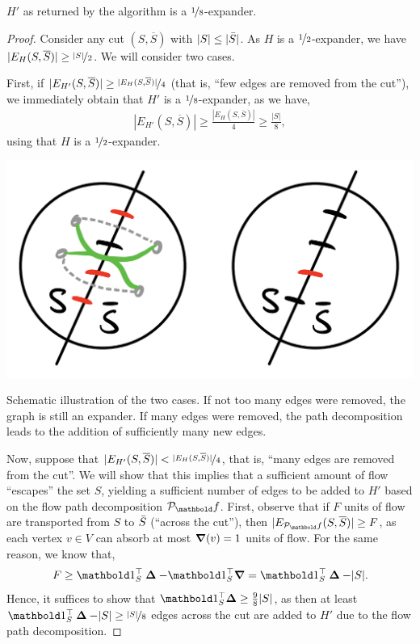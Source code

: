 \documentclass[nobib]{tufte-handout}
\newcommand{\cut}{(S, \overline{S})}
\newcommand{\pathdecomp}{\mathcal{P}_\vf}
\begin{document}
\begin{thm}
$H'$ as returned by the algorithm is a $\nicefrac{1}{8}$-expander.
\end{thm}
\begin{proof}
Consider any cut $\cut$ with $|S| \leq |\Bar{S}|$. As $H$ is a $\nicefrac{1}{2}$-expander, we have $|E_H\cut| \geq \nicefrac{|S|}{2}$. We will consider two cases.

First, if $|E_{H'}\cut| \geq \nicefrac{|E_H\cut|}{4}$ (that is, ``few edges are removed from the cut''), we immediately obtain that $H'$ is a $\nicefrac{1}{8}$-expander, as we have, \begin{align*}
    |E_{H'}\cut| \geq \frac{|E_H\cut|}{4} \geq \frac{|S|}{8},
\end{align*} using that $H$ is a $\nicefrac{1}{2}$-expander.

\begin{marginfigure}[7\baselineskip]
\includegraphics[width=\textwidth]{assignments/figures/cuts.png}
\caption{Schematic illustration of the two cases. If not too many edges were removed, the graph is still an expander. If many edges were removed, the path decomposition leads to the addition of sufficiently many new edges.}
\end{marginfigure}

Now, suppose that $|E_{H'}\cut| < \nicefrac{|E_H\cut|}{4}$, that is, ``many edges are removed from the cut''. We will show that this implies that a sufficient amount of flow ``escapes'' the set $S$, yielding a sufficient number of edges to be added to $H'$ based on the flow path decomposition $\pathdecomp$. First, observe that if $F$ units of flow are transported from $S$ to $\Bar{S}$ (``across the cut''), then $|E_{\pathdecomp}\cut| \geq F$, as each vertex $v \in V$ can absorb at most $\boldsymbol{\nabla}(v) = 1$ units of flow. For the same reason, we know that, \begin{align*}
    F \geq \trans{\vOne_S}\vDelta - \trans{\vOne_S}\vnabla = \trans{\vOne_S}\vDelta - |S|.
\end{align*} Hence, it suffices to show that $\trans{\vOne_S}\vDelta \geq \frac{9}{8}|S|$, as then at least $\trans{\vOne_S}\vDelta - |S| \geq \nicefrac{|S|}{8}$ edges across the cut are added to $H'$ due to the flow path decomposition.


\end{proof}
\end{document}
